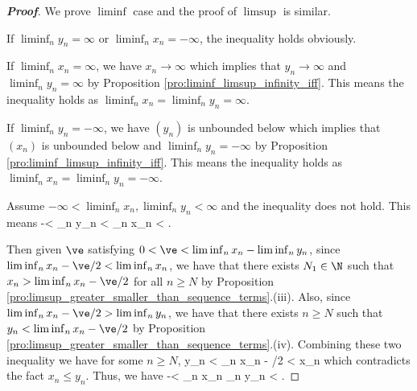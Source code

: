 \begin{proof}[\bf Proof]
We prove $\liminf$ case and the proof of $\limsup$ is similar.

If $\liminf_n y_n = \infty$ or $\liminf_n x_n = -\infty$, the inequality holds obviously.

If $\liminf_n x_n = \infty$, we have $x_n \to \infty$ which implies that $y_n\to \infty$ and $\liminf_n y_n = \infty$ by Proposition \ref{pro:liminf_limsup_infinity_iff}. This means the inequality holds as $\liminf_n x_n = \liminf_n y_n = \infty$.

If $\liminf_n y_n = -\infty$, we have $(y_n)$ is unbounded below which implies that $(x_n)$ is unbounded below and $\liminf_n y_n = -\infty$ by Proposition \ref{pro:liminf_limsup_infinity_iff}. This means the inequality holds as $\liminf_n x_n = \liminf_n y_n = -\infty$.

Assume $-\infty < \liminf_n x_n, \liminf_n y_n < \infty$ and the inequality does not hold. This means
\be
-\infty < \liminf_n y_n < \liminf_n x_n < \infty.
\ee

Then given $\ve$ satisfying $0<\ve< \liminf_n x_n - \liminf_n y_n$, since $\liminf_n x_n - \ve/2 < \liminf_n x_n$, we have that there exists $N_1\in \N$ such that $x_n > \liminf_n x_n - \ve/2$ for all $n\geq N$ by Proposition \ref{pro:limsup_greater_smaller_than_sequence_terms}.(iii). Also, since $\liminf_n x_n - \ve/2 > \liminf_n y_n$, we have that there exists $n\geq N$ such that $y_n < \liminf_n x_n - \ve/2$ by Proposition \ref{pro:limsup_greater_smaller_than_sequence_terms}.(iv). Combining these two inequality we have for some $n\geq N$,
\be
y_n < \liminf_n x_n - \ve/2 < x_n
\ee
which contradicts the fact $x_n\leq y_n$. Thus, we have
\be
-\infty < \liminf_n x_n \leq \liminf_n y_n < \infty.
\ee
\end{proof}








